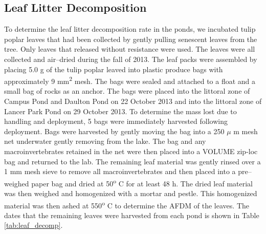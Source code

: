 \subsection{Leaf Litter Decomposition}

To determine the leaf litter decomposition rate in the ponds, we incubated tulip poplar leaves that had been collected by gently pulling senescent leaves from the tree. Only leaves that released without resistance were used.  The leaves were all collected and air--dried during the fall of 2013.  The leaf packs were assembled by placing 5.0 g of the tulip poplar leaved into plastic produce bags with approximately 9 mm\textsuperscript{2} mesh. The bags were sealed and attached to a float and a small bag of rocks as an anchor.  The bags were placed into the littoral zone of Campus Pond and Daulton Pond on 22 October 2013 and into the littoral zone of Lancer Park Pond on 29 October 2013. To determine the mass lost due to handling and deployment, 5 bags were immediately harvested following deployment. Bags were harvested by gently moving the bag into a 250 $\mu$ m mesh net underwater gently removing from the lake. The bag and any macroinvertebrates retained in the net were then placed into a VOLUME zip-loc bag and returned to the lab.  The remaining leaf material was gently rinsed over a 1 mm mesh sieve to remove all macroinvertebrates and then placed into a pre--weighed paper bag and dried at 50\textsuperscript{o} C for at least 48 h.  The dried leaf material was then weighed and homogenized with a mortar and pestle. This homogenized material was then ashed at 550\textsuperscript{o} C to determine the AFDM of the leaves. The dates that the remaining leaves were harvested from each pond is shown in Table \ref{tab:leaf_decomp}. 